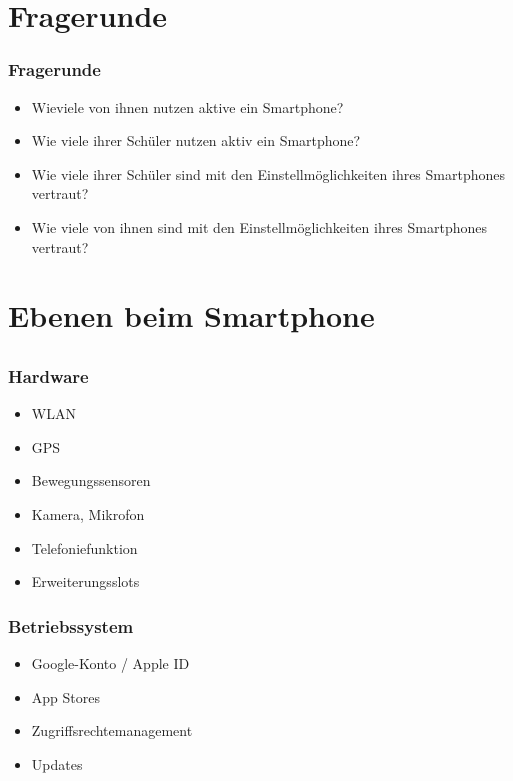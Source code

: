 \documentclass[12pt]{beamer}
\begin{document}
\section{Fragerunde}
\begin{frame}
    \frametitle{Fragerunde}
    \begin{itemize}
	    \item<2-> Wieviele von ihnen nutzen aktive ein Smartphone?
	    \item<3-> Wie viele ihrer Schüler nutzen aktiv ein Smartphone?
	    \item<4-> Wie viele ihrer Schüler sind mit den Einstellmöglichkeiten ihres Smartphones vertraut?
	    \item<5-> Wie viele von ihnen sind mit den Einstellmöglichkeiten ihres Smartphones vertraut?
    \end{itemize}
\end{frame}

\section{Ebenen beim Smartphone}
\subsection{}

\begin{frame}
	\frametitle{Hardware}
	\begin{itemize}
		\item<2-> WLAN
		\item<3-> GPS
		\item<4-> Bewegungssensoren
		\item<5-> Kamera, Mikrofon
		\item<6-> Telefoniefunktion
		\item<7-> Erweiterungsslots
	\end{itemize}
\end{frame}

\begin{frame}
	\frametitle{Betriebssystem}
	\begin{itemize}
		\item<2-> Google-Konto / Apple ID
		\item<3-> App Stores
		\item<4-> Zugriffsrechtemanagement
		\item<5-> Updates
	\end{itemize}
\end{frame}
\end{document}

